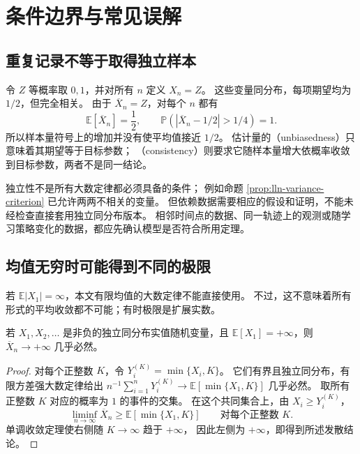 \documentclass[UTF8]{ctexart}
\begin{document}
\section{条件边界与常见误解}
\label{sec:lln-boundaries}

\subsection{重复记录不等于取得独立样本}

\begin{example}
\label{ex:lln-dependent-failure}
令 $Z$ 等概率取 $0,1$，并对所有 $n$ 定义 $X_n=Z$。
这些变量同分布，每项期望均为 $1/2$，但完全相关。
由于 $\overline X_n=Z$，对每个 $n$ 都有
\[
  \mathbb E[\overline X_n]=\frac12,\qquad
  \mathbb P(|\overline X_n-1/2|>1/4)=1.
\]
所以样本量符号上的增加并没有使平均值接近 $1/2$。
估计量的（unbiasedness）只意味着其期望等于目标参数；
（consistency）则要求它随样本量增大依概率收敛到目标参数，两者不是同一结论。
\end{example}

独立性不是所有大数定律都必须具备的条件；
例如命题 \ref{prop:lln-variance-criterion} 已允许两两不相关的变量。
但依赖数据需要相应的假设和证明，不能未经检查直接套用独立同分布版本。
相邻时间点的数据、同一轨迹上的观测或随学习策略变化的数据，都应先确认模型是否符合所用定理。

\subsection{均值无穷时可能得到不同的极限}

若 $\mathbb E|X_1|=\infty$，本文有限均值的大数定律不能直接使用。
不过，这不意味着所有形式的平均收敛都不可能；有时极限是扩展实数。

\begin{proposition}[非负且均值无穷的情形]
\label{prop:lln-infinite-mean}
若 $X_1,X_2,\ldots$ 是非负的独立同分布实值随机变量，且
$\mathbb E[X_1]=+\infty$，则 $\overline X_n\to+\infty$ 几乎必然。
\end{proposition}

\begin{proof}
对每个正整数 $K$，令 $Y_i^{(K)}=\min\{X_i,K\}$。
它们有界且独立同分布，有限方差强大数定律给出
$n^{-1}\sum_{i=1}^nY_i^{(K)}\to\mathbb E[\min\{X_1,K\}]$ 几乎必然。
取所有正整数 $K$ 对应的概率为 $1$ 的事件的交集。
在这个共同集合上，由 $X_i\geq Y_i^{(K)}$，
\[
  \liminf_{n\to\infty}\overline X_n
  \geq\mathbb E[\min\{X_1,K\}]
  \qquad\text{对每个正整数 }K.
\]
单调收敛定理使右侧随 $K\to\infty$ 趋于 $+\infty$，
因此左侧为 $+\infty$，即得到所述发散结论。
\end{proof}
\end{document}
